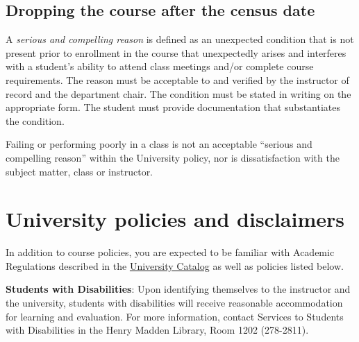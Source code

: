 \hypertarget{dropping-the-course-after-the-census-date}{%
\subsection{Dropping the course after the census
date}\label{dropping-the-course-after-the-census-date}}

A \emph{serious and compelling reason} is defined as an unexpected
condition that is not present prior to enrollment in the course that
unexpectedly arises and interferes with a student's ability to attend
class meetings and/or complete course requirements. The reason must be
acceptable to and verified by the instructor of record and the
department chair. The condition must be stated in writing on the
appropriate form. The student must provide documentation that
substantiates the condition.

Failing or performing poorly in a class is not an acceptable ``serious
and compelling reason'' within the University policy, nor is
dissatisfaction with the subject matter, class or instructor.

\hypertarget{university-policies-and-disclaimers}{%
\section{University policies and
disclaimers}\label{university-policies-and-disclaimers}}

In addition to course policies, you are expected to be familiar with
Academic Regulations described in the
\href{http://www.fresnostate.edu/catalog/academic-regulations/}{University
Catalog} as well as policies listed below.

\textbf{Students with Disabilities}: Upon identifying themselves to the
instructor and the university, students with disabilities will receive
reasonable accommodation for learning and evaluation. For more
information, contact Services to Students with Disabilities in the Henry
Madden Library, Room 1202 (278-2811).

